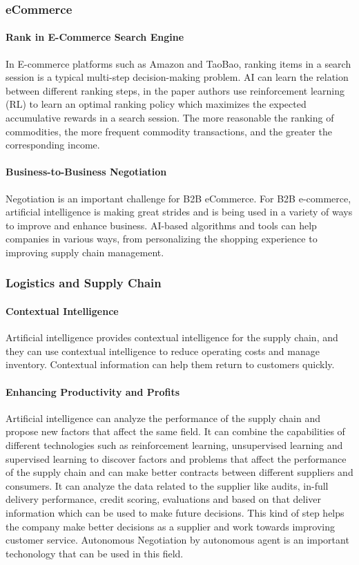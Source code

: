 \subsubsection{eCommerce}
\paragraph{Rank in E-Commerce Search Engine} In E-commerce platforms such as Amazon and TaoBao, ranking items in a search session is a typical multi-step decision-making problem. AI can learn the relation between different ranking steps, in the paper
\parencite{Hu2018} authors use reinforcement learning (RL) to learn an optimal ranking policy which maximizes the expected accumulative rewards in a search session. The more reasonable the ranking of commodities, the more frequent commodity transactions, and the greater the corresponding income.

\paragraph{Business-to-Business Negotiation} Negotiation is an important challenge for B2B eCommerce. For B2B e-commerce, artificial intelligence is making great strides and is being used in a variety of ways to improve and enhance business\parencite{Hans01}. AI-based algorithms and tools can help companies in various ways, from personalizing the shopping experience to improving supply chain management.

\subsubsection{Logistics and Supply Chain}
\paragraph{Contextual Intelligence} Artificial intelligence provides contextual intelligence for the supply chain, and they can use contextual intelligence to reduce operating costs and manage inventory. Contextual information can help them return to customers quickly.   
\paragraph{Enhancing Productivity and Profits} Artificial intelligence can analyze the performance of the supply chain and propose new factors that affect the same field. It can combine the capabilities of different technologies such as reinforcement learning, unsupervised learning and supervised learning to discover factors and problems that affect the performance of the supply chain and can make better contracts between different suppliers and consumers\parencite{Pndey2019}. It can analyze the data related to the supplier like audits, in-full delivery performance, credit scoring, evaluations and based on that deliver information which can be used to make future decisions. This kind of step helps the company make better decisions as a supplier and work towards improving customer service. Autonomous Negotiation by autonomous agent is an important techonology that can be used in this field. 

